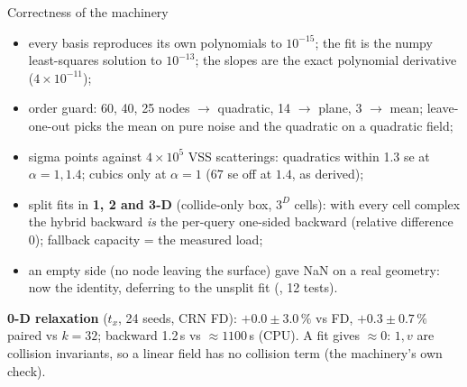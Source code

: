 \documentclass[10pt,aspectratio=169]{beamer}
\begin{document}
\begin{frame}{Correctness of the machinery}
\small
\begin{itemize}
\item every basis reproduces its own polynomials to $10^{-15}$; the fit is the numpy least-squares
  solution to $10^{-13}$; the slopes are the exact polynomial derivative ($4\times10^{-11}$);
\item order guard: 60, 40, 25 nodes $\to$ quadratic, 14 $\to$ plane, 3 $\to$ mean;
  leave-one-out picks the mean on pure noise and the quadratic on a quadratic field;
\item sigma points against $4\times10^5$ VSS scatterings: quadratics within 1.3 se at $\alpha = 1, 1.4$; cubics
  only at $\alpha = 1$ ($67$ se off at $1.4$, as derived);
\item split fits in \textbf{1, 2 and 3-D} (collide-only box, $3^D$ cells): with every cell complex the hybrid
  backward \emph{is} the per-query one-sided backward (relative difference $0$); fallback capacity = the
  measured load;
\item an empty side (no node leaving the surface) gave NaN on a real geometry: now the identity, deferring
  to the unsplit fit (, 12 tests).
\end{itemize}
\textbf{0-D relaxation} ($t_x$, 24 seeds, CRN FD):  $+0.0\pm3.0\,\%$ vs FD, $+0.3\pm0.7\,\%$ paired
vs $k = 32$; backward 1.2\,s vs $\approx1100$\,s (CPU).  A  fit gives $\approx0$: $1, v$ are collision
invariants, so a linear field has no collision term (the machinery's own check).
\end{frame}
\end{document}
